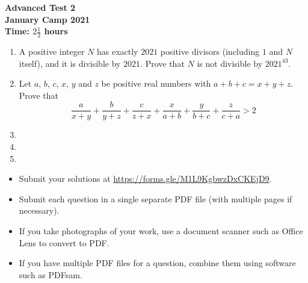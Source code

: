 \documentclass{article}
\begin{document}
\thispagestyle{empty}

\begin{center}
  \textbf{\Large Advanced Test 2}
  \\ \vspace{1em}
  \textbf{\large January Camp 2021}
  \\ \vspace{1em}
  \textbf{\large Time: $2\frac{1}{2}$ hours}
\end{center}

\vspace{24pt}

\begin{enumerate}[1.]

\item %
A positive integer $N$ has exactly $2021$ positive divisors (including $1$ and $N$ itself), and it is divisible by $2021$.
Prove that $N$ is not divisible by $2021^{43}$.


\item %
Let $a$, $b$, $c$, $x$, $y$ and $z$ be positive real numbers with $a + b + c = x + y + z$. Prove that 
$$\frac{a}{x + y} + \frac{b}{y + z} + \frac{c}{z + x} + \frac{x}{a + b} + \frac{y}{b + c} + \frac{z}{c + a} > 2 $$

\item %


\item %


\item %

\end{enumerate}


\vfill
\begin{itemize}
	\item Submit your solutions at \url{https://forms.gle/M1L9KgbwzDxCKEjD9}.
	\item Submit each question in a single separate PDF file (with multiple pages if necessary).
	\item If you take photographs of your work, use a document scanner such as Office Lens to convert to PDF.
	\item If you have multiple PDF files for a question, combine them using software such as PDFsam.
\end{itemize}

\vfill
\centering
\begin{BVerbatim}

\end{BVerbatim}
\end{document}
